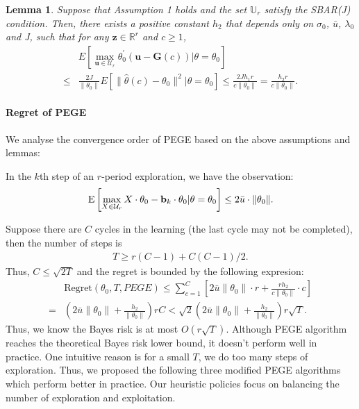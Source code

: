 \documentclass{article}
\newtheorem{lemma}[theorem]{Lemma}
\theoremstyle{plain}
\theoremstyle{definition}
\begin{document}
\begin{lemma}
Suppose that Assumption 1 holds and the set $\mathbb{U}_{r}$ satisfy the SBAR(J) condition. Then, there exists a positive constant $h_{2}$ that depends only on $\sigma_{0}$, $\bar{u}$, $\lambda_{0}$ and J, such that for any $\textbf{z}\in \mathbb{R}^{r}$ and $c\geq 1$,
\begin{align}
&E \left[ \max_{\textbf{u}\in \mathcal{U}_{r}} \theta_{0}^{'}(\textbf{u}-\textbf{G}(c))|\theta=\theta_{0}\right] \nonumber \\
\leq & \frac{2J}{\|\theta_0\|}E\left[\|\hat{\theta}(c)-\theta_{0}\|^{2}|\theta=\theta_{0}\right]\leq
\frac{2Jh_{1}r}{c\|\theta_{0}\|} =\frac{h_2r}{c\|\theta_0\|}.
\end{align}
\end{lemma}


\paragraph{Regret of PEGE}
We analyse the convergence order of PEGE based on the above assumptions and lemmas:

In the $k$th step of an $r$-period exploration, we have the observation:
\[\text{E}\left[\max_{X\in\mathcal{U}_r} X\cdot \theta_0 - \bold{b}_k\cdot\theta_0 | \theta = \theta_0\right]\leq 2\bar{u}\cdot\|\theta_0\|.\]


Suppose there are $C$ cycles in the learning (the last cycle may not be completed), then the number of steps is
\begin{align}
T \geq r(C-1) + {C(C-1)}/{2}.\label{TC:PEGE}
\end{align}
Thus, $C\leq \sqrt{2T}$ and the regret is bounded by the following expresion:
\begin{align}
&\text{Regret}(\theta_0, T, PEGE)\leq  \sum_{c=1}^{C}\left[2\bar{u}\|\theta_0\| \cdot r + \frac{rh_2}{c\|\theta_0\|}\cdot c\right] \nonumber\\
= & (2\bar{u}\|\theta_0\|+\frac{h_2}{\|\theta_0\|})rC
<  \sqrt{2}(2\bar{u}\|\theta_0\|+\frac{h_2}{\|\theta_0\|})r\sqrt{T}. \label{reg:PEGE}
\end{align}
Thus, we know the Bayes risk is at most $O(r\sqrt{T})$. Although PEGE algorithm reaches the theoretical Bayes risk lower bound, it doesn't perform well in practice. One intuitive reason is for a small $T$, we do too many steps of exploration. Thus, we proposed the following three modified PEGE algorithms which perform better in practice. Our heuristic policies focus on balancing the number of exploration and exploitation.
\end{document}
